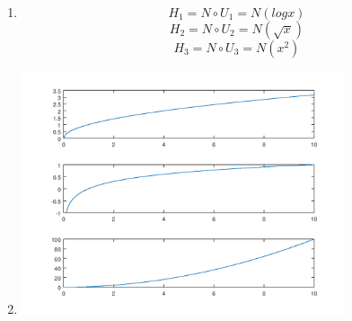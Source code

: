 \documentclass[12pt, a4]{report}
\begin{document}
\begin{enumerate}
\begin{minipage}{\linewidth}
                    \end{minipage}
                \item
                    \begin{equation}
                        H_1 = N \circ U_1 = N(log x)
                    \end{equation}
                    \begin{equation}
                        H_2 = N \circ U_2 = N(\sqrt x)
                    \end{equation}
                    \begin{equation}
                        H_3 = N \circ U_3 = N(x^2)
                    \end{equation}
                \item
                    \begin{minipage}{\linewidth}
                        \centering
                        \includegraphics[width=0.75\textwidth]{transfer}
                    \end{minipage}
            \end{enumerate}
\end{document}
